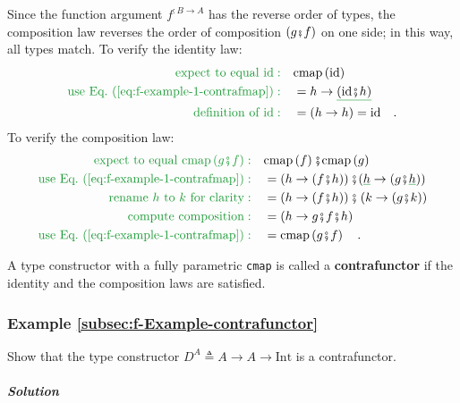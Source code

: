 \noindent Since the function argument $f^{:B\rightarrow A}$ has the
reverse order of types, the composition law reverses the order of
composition $\left(g\bef f\right)$ on one side; in this way, all
types match. To verify the identity law:
\begin{align*}
{\color{greenunder}\text{expect to equal }\text{id}:}\quad & \text{cmap}\left(\text{id}\right)\\
{\color{greenunder}\text{use Eq.~(\ref{eq:f-example-1-contrafmap})}:}\quad & =h\rightarrow\gunderline{(\text{id}\bef h)}\\
{\color{greenunder}\text{definition of }\text{id}:}\quad & =\left(h\rightarrow h\right)=\text{id}\quad.
\end{align*}
To verify the composition law:
\begin{align*}
{\color{greenunder}\text{expect to equal }\text{cmap}\left(g\bef f\right):}\quad & \text{cmap}\left(f\right)\bef\text{cmap}\left(g\right)\\
{\color{greenunder}\text{use Eq.~(\ref{eq:f-example-1-contrafmap})}:}\quad & =\left(h\rightarrow(f\bef h)\right)\bef(\gunderline h\rightarrow(g\bef\gunderline h))\\
{\color{greenunder}\text{rename }h\text{ to }k\text{ for clarity}:}\quad & =\left(h\rightarrow(f\bef h)\right)\bef\left(k\rightarrow(g\bef k)\right)\\
{\color{greenunder}\text{compute composition}:}\quad & =\left(h\rightarrow g\bef f\bef h\right)\\
{\color{greenunder}\text{use Eq.~(\ref{eq:f-example-1-contrafmap})}:}\quad & =\text{cmap}\left(g\bef f\right)\quad.
\end{align*}

A type constructor with a fully parametric \lstinline!cmap! is called
a \textbf{contrafunctor} if the identity and
the composition laws are satisfied.

\subsubsection{Example \label{subsec:f-Example-contrafunctor}\ref{subsec:f-Example-contrafunctor}}

Show that the type constructor $D^{A}\triangleq A\rightarrow A\rightarrow\text{Int}$
is a contrafunctor.

\subparagraph{Solution}

